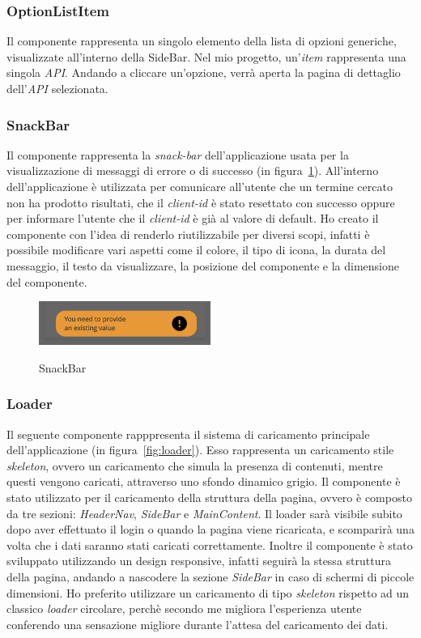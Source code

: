 \subsubsection{OptionListItem}\label{subsubsec:option-list-item}
Il componente rappresenta un singolo elemento della lista di opzioni generiche, visualizzate all'interno della SideBar. Nel mio progetto, un'\textit{item} rappresenta una singola \textit{API}.
Andando a cliccare un'opzione, verrà aperta la pagina di dettaglio dell'\textit{API} selezionata.

\subsubsection{SnackBar}\label{subsubsec:snack-bar}
Il componente rappresenta la \textit{snack-bar} dell'applicazione usata per la visualizzazione di messaggi di errore o di successo (in figura~\ref{fig:snack-bar}).
All'interno dell'applicazione è utilizzata per comunicare all'utente che un termine cercato non ha prodotto risultati,  che il \textit{client-id} è stato resettato con successo
oppure per informare l'utente che il \textit{client-id} è già al valore di default.
Ho creato il componente con l'idea di renderlo riutilizzabile per diversi scopi, infatti è possibile modificare vari aspetti come il colore, il tipo di icona,
la durata del messaggio, il testo da visualizzare, la posizione del componente e la dimensione del componente.

\begin{figure}[ht]
  \centering
  \includegraphics[width=0.5\textwidth, alt={Snackbar di errore}]{images/frontend/SnackBar1.jpg}
  \caption{SnackBar}\label{fig:snack-bar}
\end{figure}

\subsubsection{Loader}\label{subsubsec:loader}
Il seguente componente rapppresenta il sistema di caricamento principale dell'applicazione (in figura~\ref{fig:loader}).
Esso rappresenta un caricamento stile \textit{skeleton}, ovvero un caricamento che simula la presenza di contenuti, mentre questi vengono caricati, attraverso 
uno sfondo dinamico grigio.
Il componente è stato utilizzato per il caricamento della struttura della pagina, ovvero è composto da tre sezioni: \textit{HeaderNav}, \textit{SideBar} e
\textit{MainContent}. Il loader sarà visibile subito dopo aver effettuato il login o quando la pagina viene ricaricata, e scomparirà una volta che i dati saranno stati caricati correttamente.
Inoltre il componente è stato sviluppato utilizzando un design responsive, infatti seguirà la stessa struttura della pagina, andando a nascodere la sezione 
\textit{SideBar} in caso di schermi di piccole dimensioni.
Ho preferito utilizzare un caricamento di tipo \textit{skeleton} rispetto ad un classico \textit{loader} circolare, perchè secondo me migliora l'esperienza utente 
conferendo una sensazione migliore durante l'attesa del caricamento dei dati.

